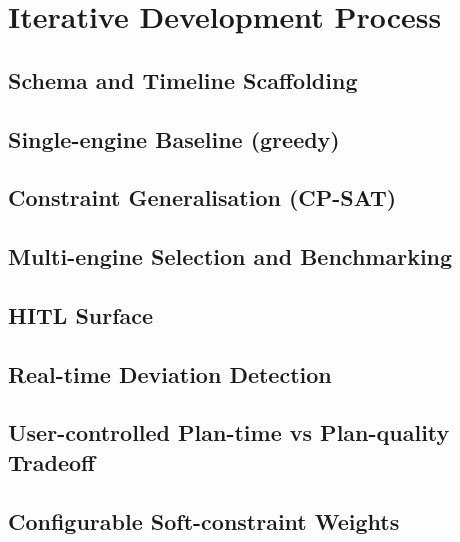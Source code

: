 \section{Iterative Development Process}
\label{sec:iterations}

\subsection{Schema and Timeline Scaffolding}
\label{sec:iter-schema}

\subsection{Single-engine Baseline (greedy)}
\label{sec:iter-greedy}

\subsection{Constraint Generalisation (CP-SAT)}
\label{sec:iter-cpsat}

\subsection{Multi-engine Selection and Benchmarking}
\label{sec:iter-multiengine}

\subsection{HITL Surface}
\label{sec:iter-hitl}

\subsection{Real-time Deviation Detection}
\label{sec:iter-deviations}

\subsection{User-controlled Plan-time vs Plan-quality Tradeoff}
\label{sec:iter-tradeoff}

\subsection{Configurable Soft-constraint Weights}
\label{sec:iter-weights}

